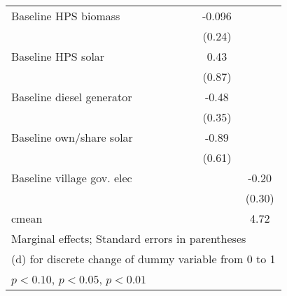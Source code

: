 \begin{table}[htbp]
\begin{tabular*}{1\hsize}{@{\hskip\tabcolsep\extracolsep\fill}l*{6}{c}}
Baseline HPS biomass&                  &                  &                  &                  &   -0.096         &                  \\
                &                  &                  &                  &                  &   (0.24)         &                  \\
Baseline HPS solar&                  &                  &                  &                  &     0.43         &                  \\
                &                  &                  &                  &                  &   (0.87)         &                  \\
Baseline diesel generator&                  &                  &                  &                  &    -0.48         &                  \\
                &                  &                  &                  &                  &   (0.35)         &                  \\
Baseline own/share solar&                  &                  &                  &                  &    -0.89         &                  \\
                &                  &                  &                  &                  &   (0.61)         &                  \\
Baseline village gov. elec&                  &                  &                  &                  &                  &    -0.20         \\
                &                  &                  &                  &                  &                  &   (0.30)         \\
\midrule
cmean           &                  &                  &                  &                  &                  &     4.72         \\
\bottomrule
\multicolumn{7}{l}{\footnotesize Marginal effects; Standard errors in parentheses}\\
\multicolumn{7}{l}{\footnotesize  (d) for discrete change of dummy variable from 0 to 1}\\
\multicolumn{7}{l}{\footnotesize \sym{*} \(p<0.10\), \sym{**} \(p<0.05\), \sym{***} \(p<0.01\)}\\
\end{tabular*}
\end{table}
